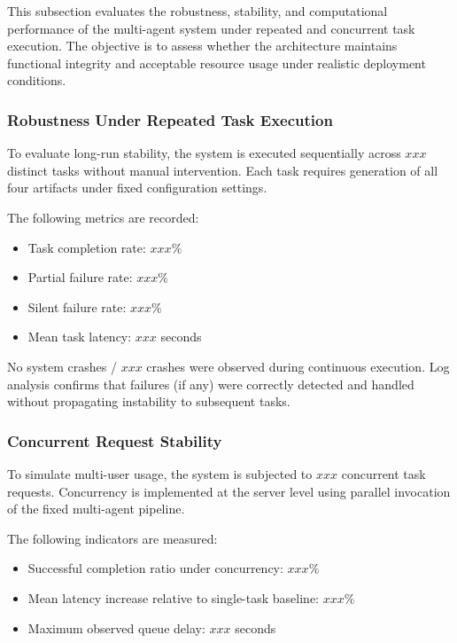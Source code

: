\documentclass[10pt,journal,compsoc]{IEEEtran}
\begin{document}
This subsection evaluates the robustness, stability, and computational performance of the multi-agent system under repeated and concurrent task execution. The objective is to assess whether the architecture maintains functional integrity and acceptable resource usage under realistic deployment conditions.

\subsubsection{Robustness Under Repeated Task Execution}

To evaluate long-run stability, the system is executed sequentially across $xxx$ distinct tasks without manual intervention. Each task requires generation of all four artifacts under fixed configuration settings.

The following metrics are recorded:

\begin{itemize}
    \item Task completion rate: $xxx\%$
    \item Partial failure rate: $xxx\%$
    \item Silent failure rate: $xxx\%$
    \item Mean task latency: $xxx$ seconds
\end{itemize}

No system crashes / $xxx$ crashes were observed during continuous execution. Log analysis confirms that failures (if any) were correctly detected and handled without propagating instability to subsequent tasks.

\subsubsection{Concurrent Request Stability}

To simulate multi-user usage, the system is subjected to $xxx$ concurrent task requests. Concurrency is implemented at the server level using parallel invocation of the fixed multi-agent pipeline.

The following indicators are measured:

\begin{itemize}
    \item Successful completion ratio under concurrency: $xxx\%$
    \item Mean latency increase relative to single-task baseline: $xxx\%$
    \item Maximum observed queue delay: $xxx$ seconds
\end{itemize}
\end{document}
